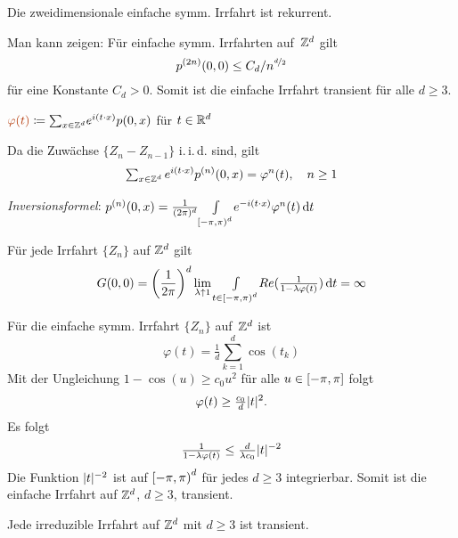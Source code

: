 \documentclass{cheat-sheet}
\newcommand{\iid}{i.\,i.\,d.} %
\newcommand{\Defn}[1]{\textcolor{DefinitionColor}{#1}}
\begin{document}
\begin{fazit}
  Die zweidimensionale einfache symm. Irrfahrt ist rekurrent.
\end{fazit}


\begin{bem}
  Man kann zeigen:
  Für einfache symm. Irrfahrten auf~$\mathbb{Z}^d$ gilt
  \[ p^{(2n)}(0,0) \leq C_d / n^{\nicefrac{d}{2}} \]
  für eine Konstante $C_d > 0$.
  Somit ist die einfache Irrfahrt transient für alle $d \geq 3$.
\end{bem}

\begin{defn}
  $\Defn{\varphi(t)} \coloneqq {\sum}_{x \in \Z^d} e^{i (t \cdot x)} p(0, x)$ \quad
  für $t \in \mathbb{R}^d$
\end{defn}

\begin{bem}
  Da die Zuwächse $\{ Z_n - Z_{n-1} \}$ \iid{} sind, gilt
  \[ {\sum}_{x \in \Z^d} \, e^{i (t \cdot x)} p^{(n)}(0, x) = \varphi^n(t), \quad n \geq 1 \]

  \textit{Inversionsformel}: \quad
  $p^{(n)}(0, x) = \tfrac{1}{(2 \pi)^d} {\textstyle \int\limits_{\left[ -\pi, \pi \right)^d}^{}} e^{- i (t \cdot x)} \varphi^n(t) \,\mathrm{d} t$
\end{bem}

\begin{satz}
  Für jede Irrfahrt $\{ Z_n \}$ auf $\mathbb{Z}^d$ gilt
  \[ G(0, 0) = \left( \frac{1}{2 \pi} \right)^d \lim_{\lambda \uparrow 1} {\textstyle \int\limits_{t \in \left[ -\pi, \pi \right)^d}^{}} Re(\tfrac{1}{1 - \lambda \varphi(t)}) \,\mathrm{d} t = \infty \]
\end{satz}

\begin{bsp}
  Für die einfache symm. Irrfahrt $\{ Z_n \}$ auf~$\mathbb{Z}^d$ ist
  \[
    \varphi(t) = \tfrac{1}{d} {\sum}_{k=1}^d \cos(t_k)
  \]
  Mit der Ungleichung $1 - \cos(u) \geq c_0 u^2$ für alle $u \in \left[ - \pi, \pi \right]$ folgt
  \[
    \varphi(t) \geq \tfrac{c_0}{d} \lvert t\rvert^2.
  \]
  Es folgt
  \[
    \tfrac{1}{1 - \lambda \varphi(t)} \leq \tfrac{d}{\lambda c_0} \lvert t\rvert^{-2}
  \]
  Die Funktion $\lvert t\rvert^{-2}$ ist auf $\left[ -\pi, \pi \right)^d$ für jedes $d \geq 3$ integrierbar.
  Somit ist die einfache Irrfahrt auf $\mathbb{Z}^d$, $d \geq 3$, transient.
\end{bsp}

\begin{satz}
  Jede irreduzible Irrfahrt auf $\mathbb{Z}^d$ mit $d \geq 3$ ist transient.
\end{satz}
\end{document}
